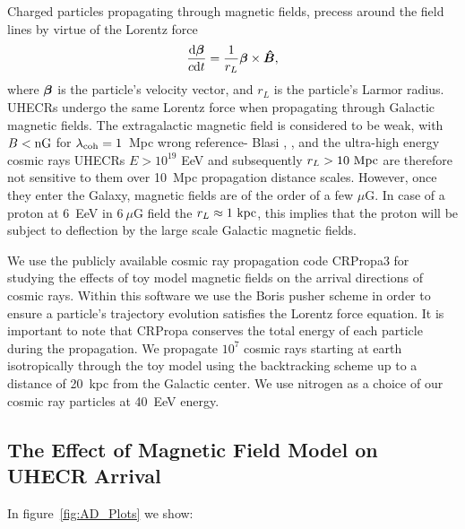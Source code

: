 \documentclass[usenatbib]{mnras}
\newcommand{\Andrew}[1]{\textcolor{dg}{#1}}
\newcommand{\bfm}[1]{\mbox{\boldmath$ #1 $}}
\begin{document}
Charged particles propagating through magnetic fields, precess around the field lines by virtue of the Lorentz force 
\begin{eqnarray}
\frac{{\rm d}\bfm{\beta}}{c{\rm d}t} = \frac{1}{r_{L}}\bfm{\beta}\times \bfm{\hat{B}}, 
\end{eqnarray}
where $\bfm{\beta}$ is the particle's velocity vector, and $r_{L}$ is the particle's Larmor radius. UHECRs undergo the same Lorentz force when propagating through Galactic magnetic fields. The extragalactic magnetic field is considered to be weak, with $B < \rm {nG}$ for $\lambda_{\rm coh}=1$~Mpc \cite{Blasi} \Andrew{wrong reference- Blasi }, \cite{Kronberg_2007}, and the ultra-high energy cosmic rays UHECRs $E > 10^{19}$ EeV and subsequently $r_{L}>{\rm 10~Mpc}$ are therefore not sensitive to them over 10~Mpc propagation distance scales. However, once they enter the Galaxy, magnetic fields are of the order of a few $\mu$G. In case of a proton at 6~EeV in $6~\mu$G field the $r_L \approx 1 ~ \rm kpc$, this implies that the proton will be subject to deflection by the large scale Galactic magnetic fields.

We use the publicly available cosmic ray propagation code CRPropa3 \cite{CRPropa3_2016} for studying the effects of toy model magnetic fields on the arrival directions of cosmic rays. Within this software we use the Boris pusher scheme in order to ensure a particle's trajectory evolution satisfies the Lorentz force equation. It is important to note that CRPropa conserves the total energy of each particle during the propagation.
We propagate $10^7$ cosmic rays starting at earth isotropically through the toy model using the backtracking scheme up to a distance of 20~kpc from the Galactic center. We use nitrogen as a choice of our cosmic ray particles at 40~EeV energy. 

\subsection{The Effect of Magnetic Field Model on UHECR Arrival}

In figure~\ref{fig:AD_Plots} we show:
\end{document}
